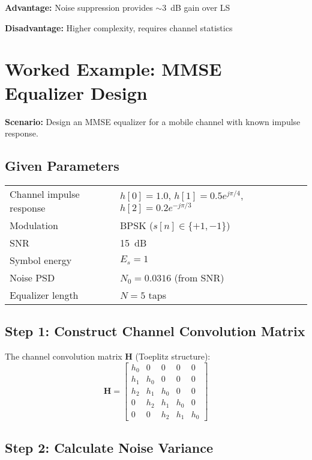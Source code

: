 \textbf{Advantage:} Noise suppression provides $\sim$3~dB gain over LS

\textbf{Disadvantage:} Higher complexity, requires channel statistics

\section{Worked Example: MMSE Equalizer Design}
\label{sec:worked-example}

\textbf{Scenario:} Design an MMSE equalizer for a mobile channel with known impulse response.

\subsection*{Given Parameters}

\begin{tabular}{@{}ll@{}}
Channel impulse response & $h[0] = 1.0$, $h[1] = 0.5e^{j\pi/4}$, $h[2] = 0.2e^{-j\pi/3}$ \\
Modulation & BPSK ($s[n] \in \{+1, -1\}$) \\
SNR & 15~dB \\
Symbol energy & $E_s = 1$ \\
Noise PSD & $N_0 = 0.0316$ (from SNR) \\
Equalizer length & $N = 5$ taps \\
\end{tabular}

\subsection*{Step 1: Construct Channel Convolution Matrix}

The channel convolution matrix $\mathbf{H}$ (Toeplitz structure):
\begin{equation}
\mathbf{H} = \begin{bmatrix}
h_0 & 0 & 0 & 0 & 0 \\
h_1 & h_0 & 0 & 0 & 0 \\
h_2 & h_1 & h_0 & 0 & 0 \\
0 & h_2 & h_1 & h_0 & 0 \\
0 & 0 & h_2 & h_1 & h_0
\end{bmatrix}
\end{equation}

\subsection*{Step 2: Calculate Noise Variance}

